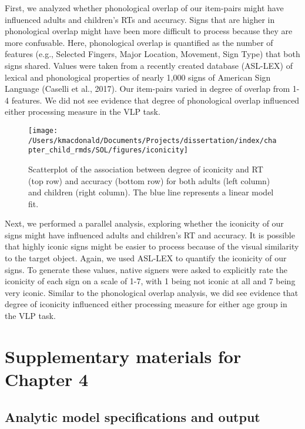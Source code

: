 \documentclass[oneside]{report}
\begin{document}
First, we analyzed whether phonological overlap of our item-pairs might
have influenced adults and children's RTs and accuracy. Signs that are
higher in phonological overlap might have been more difficult to process
because they are more confusable. Here, phonological overlap is
quantified as the number of features (e.g., Selected Fingers, Major
Location, Movement, Sign Type) that both signs shared. Values were taken
from a recently created database (ASL-LEX) of lexical and phonological
properties of nearly 1,000 signs of American Sign Language (Caselli et
al., 2017). Our item-pairs varied in degree of overlap from 1-4
features. We did not see evidence that degree of phonological overlap
influenced either processing measure in the VLP task.
\begin{figure}[t]

{\centering \texttt{[image: /Users/kmacdonald/Documents/Projects/dissertation/index/chapter\_child\_rmds/SOL/figures/iconicity]} 

}

\caption[association between degree of iconicity and RT/Accuracy.]{Scatterplot of the association between degree of iconicity and RT (top row) and accuracy (bottom row) for both adults (left column) and children (right column). The blue line represents a linear model fit.}\label{fig:unnamed-chunk-13}
\end{figure}
Next, we performed a parallel analysis, exploring whether the iconicity
of our signs might have influenced adults and children's RT and
accuracy. It is possible that highly iconic signs might be easier to
process because of the visual similarity to the target object. Again, we
used ASL-LEX to quantify the iconicity of our signs. To generate these
values, native signers were asked to explicitly rate the iconicity of
each sign on a scale of 1-7, with 1 being not iconic at all and 7 being
very iconic. Similar to the phonological overlap analysis, we did see
evidence that degree of iconicity influenced either processing measure
for either age group in the VLP task.

\hypertarget{supplementary-materials-for-chapter-4}{%
\chapter{Supplementary materials for Chapter
4}\label{supplementary-materials-for-chapter-4}}

\hypertarget{analytic-model-specifications-and-output}{%
\section{Analytic model specifications and
output}\label{analytic-model-specifications-and-output}}
\end{document}
